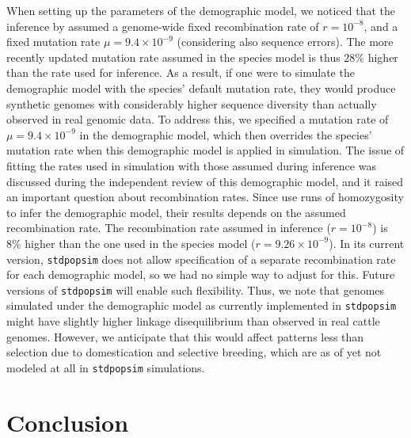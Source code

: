 \documentclass[hidelinks]{article}
\newcommand{\stdpopsim}{\texttt{stdpopsim}\xspace}
\begin{document}
When setting up the parameters of the demographic model, we noticed that the inference by \cite{MacLeod2013} assumed a genome-wide fixed recombination rate of \(r=10^{-8}\), and a fixed mutation rate \(\mu=9.4 \times 10^{-9}\) (considering also sequence errors).
The more recently updated mutation rate assumed in the species model \citep[\(1.2\times 10^{-8}\) from][]{Harland2017}
is thus \(28\%\) higher than the rate used for inference.
As a result, if one were to simulate the demographic model with the species' default mutation rate, they would produce synthetic genomes with considerably higher sequence diversity than actually observed in real genomic data.
To address this, we specified a mutation rate of \(\mu=9.4 \times 10^{-9}\) in the demographic model,
which then overrides the species' mutation rate when this demographic model is applied in simulation.
The issue of fitting the rates used in simulation with those assumed during inference was discussed during the independent review of this demographic model, and it raised an important question about recombination rates. Since \cite{MacLeod2013} use runs of homozygosity to infer the demographic model, their results depends on the assumed recombination rate. The recombination rate assumed in inference (\(r=10^{-8}\)) is \(8\%\) higher than the one used in the species model (\(r=9.26\times 10^{-9}\)). In its current version, \stdpopsim does not allow specification of a separate recombination rate for each demographic model, so we had no simple way to adjust for this. Future versions of \stdpopsim will enable such flexibility. Thus, we note that genomes simulated under the demographic model as currently implemented in \stdpopsim 
might have slightly higher linkage disequilibrium than observed in real cattle genomes.
However, we anticipate that this would affect patterns less
than selection due to domestication and selective breeding,
which are as of yet not modeled at all in \stdpopsim simulations.

\section*{Conclusion}
    \label{conclusion}
\end{document}
